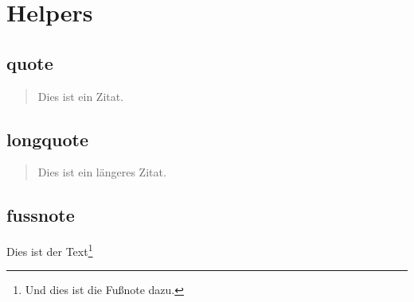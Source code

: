 \chapter{Helpers}
	\section{quote} 
		\begin{quote}
			Dies ist ein Zitat.
		\end{quote}
	\section{longquote} 	
		\begin{quotation}
			Dies ist ein längeres Zitat.
		\end{quotation} 
	\section{fussnote}
		Dies ist der Text\footnote{Und dies ist die Fußnote dazu.}
